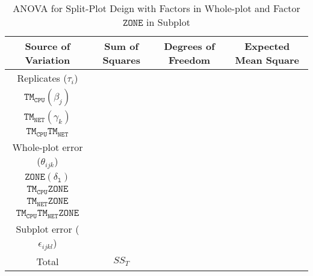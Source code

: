 \documentclass{article}
\begin{document}
\begin{table}[h!]
    \def\arraystretch{1.5}
    \centering
    \begin{tabular}{c c c c}
\hline
\textbf{Source of Variation} & S\textbf{um of Squares} & \textbf{Degrees of Freedom} & \textbf{Expected Mean Square} \\
\hline
    Replicates ($\tau_i$) & & & \\
     $\mathtt{TM_{CPU}}(\beta_j)$& & &\\
      $\mathtt{TM_{NET}}(\gamma_k)$& & & \\
      $\mathtt{TM_{CPU}TM_{NET}}$& & & \\
      Whole-plot error ($\theta_{ijk}$) & & & \\
      $\mathtt{ZONE(\delta_l)}$& & &\\
      $\mathtt{TM_{CPU}ZONE}$& & & \\
      $\mathtt{TM_{NET}ZONE}$& & & \\
      $\mathtt{TM_{CPU}TM_{NET}ZONE}$& & & \\
       Subplot error ($\epsilon_{ijkl}$) & & & \\
       \hline
       Total & $SS_{T}$& & \\
       \hline
      
\end{tabular}
      \caption{ANOVA for Split-Plot Deign with Factors in Whole-plot and Factor $\mathtt{ZONE}$ in Subplot}
      \label{tab:anova}
\end{table}


\begin{small}

\end{small}
\end{document}
